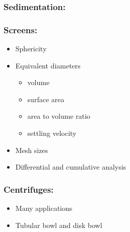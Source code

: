 {
\begin{frame}\frametitle{Sedimentation: {}}

\end{frame}}

{
\begin{frame}\frametitle{Screens: {}}
	\begin{itemize}
		\item	Sphericity
		\item	Equivalent diameters
			\begin{itemize}
				\item	volume
				\item	surface area
				\item	area to volume ratio
				\item	settling velocity
			\end{itemize}
		\item	Mesh sizes
		\item	Differential and cumulative analysis
	\end{itemize}
\end{frame}}

{
\begin{frame}\frametitle{Centrifuges: {}}
	\begin{itemize}
		\item	Many applications
		\item	Tubular bowl and disk bowl
	\end{itemize}
\end{frame}}


